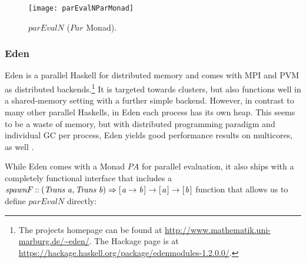 \documentclass{jfp1}
\newcommand{\Conid}[1]{\mathit{#1}}
\newcommand{\Varid}[1]{\mathit{#1}}
\renewcommand{\cite}[1]{\citep{#1}}
\begin{document}
\begin{figure}[t]
	\texttt{[image: parEvalNParMonad]}
	\caption{\ensuremath{\Varid{parEvalN}} (\ensuremath{\Conid{Par}} Monad).}
	\label{fig:parEvalNParMonadImg}
\end{figure}

\subsubsection{Eden}
Eden \cite{eden,Loogen2012} is a parallel Haskell for distributed memory and comes with MPI and PVM as distributed backends.\footnote{The projects homepage can be found at \url{http://www.mathematik.uni-marburg.de/~eden/}. The Hackage page is at \url{https://hackage.haskell.org/package/edenmodules-1.2.0.0/}.} It is targeted towards clusters, but also functions well in a shared-memory setting with a further simple backend. However, in contrast to many other parallel Haskells, in Eden each process has its own heap. This seems to be a waste of memory, but with distributed programming paradigm and individual GC per process, Eden yields good performance results on multicores, as well \cite{arcs-dc,aswad2009low}.

While Eden comes with a Monad \ensuremath{\Conid{PA}} for parallel evaluation, it also ships with a completely functional interface that includes
a \ensuremath{\Varid{spawnF}\mathbin{::}(\Conid{Trans}\;\Varid{a},\Conid{Trans}\;\Varid{b})\Rightarrow [\mskip1.5mu \Varid{a}\to \Varid{b}\mskip1.5mu]\to [\mskip1.5mu \Varid{a}\mskip1.5mu]\to [\mskip1.5mu \Varid{b}\mskip1.5mu]}
function that
allows us to define \ensuremath{\Varid{parEvalN}} directly:
\end{document}
